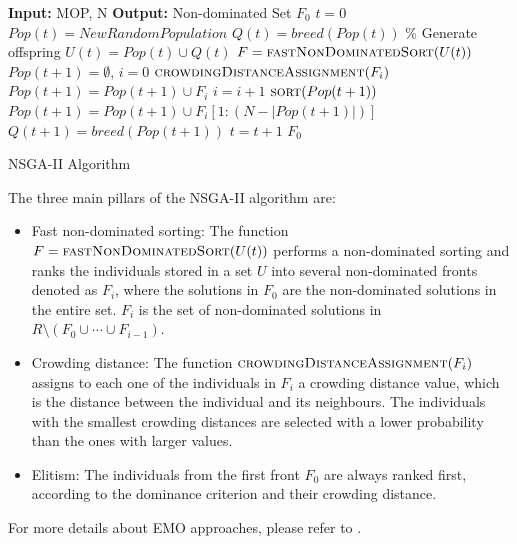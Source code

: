 \documentclass[journal]{IEEEtran}
\begin{document}
\begin{algorithm}[!t]
\begin{algorithmic}[1]
\State \textbf{Input:} MOP, N
\State \textbf{Output:} Non-dominated Set $F_0$
	\State $t = 0$
	\State $Pop(t) = NewRandomPopulation$	
	\State $Q(t) = breed (Pop(t))$ \% Generate offspring
		\State $U(t) = Pop(t) \cup Q(t)$
		\State $F = \Call{fastNonDominatedSort}{U(t)}$
	    \State $Pop(t+1) = \emptyset$, $i = 0$		
			\State $\Call{crowdingDistanceAssignment}{F_i}$	
			\State $Pop(t+1) = Pop(t+1) \cup F_i$
			\State $i = i+1$
		\EndWhile
		\State $\Call{sort}{Pop(t+1)}$
		\State $Pop(t+1) = Pop(t+1) \cup F_i[1:(N-|Pop(t+1)|)]$
		\State $Q(t+1) = breed(Pop(t+1))$	
		\State $t = t+1$
	\EndWhile
	\Return $F_0$
\end{algorithmic}
\caption{NSGA-{II} Algorithm \cite{Deb2002}}
\label{alg:nsga2}
\end{algorithm}

The three main pillars of the NSGA-II algorithm are:
\begin{itemize}
\item Fast non-dominated sorting: The function $F = \Call{fastNonDominatedSort}{U(t)}$ performs a non-dominated sorting and ranks the individuals stored in a set $U$ into several non-dominated fronts denoted as $F_i$, where the solutions in $F_0$ are the non-dominated solutions in the entire set. $F_i$ is the set of non-dominated solutions in $R \setminus (F_0 \cup \cdots \cup F_{i-1})$. 
\item Crowding distance: The function $\Call{crowdingDistanceAssignment}{F_i}$ assigns to each one of the individuals in $F_i$ a crowding distance value, which is the distance between the individual and its neighbours. The individuals with the smallest crowding distances are selected with a lower probability than the ones with larger values.   
\item Elitism: The individuals from the first front $F_0$ are always ranked first, according to the dominance criterion and their crowding distance. 
\end{itemize}


For more details about EMO approaches, please refer to \cite{Deb2001}.
\end{document}
